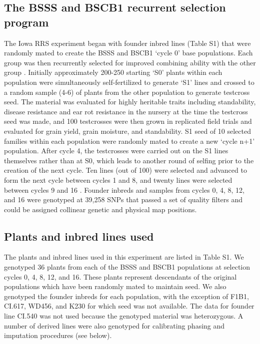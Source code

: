 \documentclass[twocolumn,twoside,letterpaper]{article}
\begin{document}
\subsection*{The BSSS and BSCB1 recurrent selection program}
The Iowa RRS experiment began with founder inbred lines (Table S1) that were randomly mated to create the BSSS and BSCB1 ‘cycle 0’ base populations. 
Each group was then recurrently selected for improved combining ability with the other group \citep{penny1971twenty, keeratinijakal1993responses}. 
Initially approximately 200-250 starting ‘S0’ plants within each population were simultaneously self-fertilized to generate ‘S1’ lines and crossed to a random sample (4-6) of plants from the other population to generate testcross seed. 
The material was evaluated for highly heritable traits including standability, disease resistance and ear rot resistance in the nursery at the time the testcross seed was made, and 100 testcrosses were then grown in replicated field trials and evaluated for grain yield, grain moisture, and standability.  
S1 seed of 10 selected families within each population were randomly mated to create a new ‘cycle n+1’ population. 
After cycle 4, the testcrosses were carried out on the S1 lines themselves rather than at S0, which leads to another round of selfing prior to the creation of the next cycle. Ten lines (out of 100) were selected and advanced to form the next cycle between cycles 1 and 8, and twenty lines were selected between cycles 9 and 16 \citep{keeratinijakal1993responses}. 
Founder inbreds and samples from cycles 0, 4, 8, 12, and 16 were genotyped at 39,258 SNPs that passed a set of quality filters and could be assigned collinear genetic and physical map positions. 

\subsection*{Plants and inbred lines used}
The plants and inbred lines used in this experiment are listed in Table S1. 
We genotyped 36 plants from each of the BSSS and BSCB1 populations at selection cycles 0, 4, 8, 12, and 16. 
These plants represent descendants of the original populations which have been randomly mated to maintain seed. 
We also genotyped the founder inbreds for each population, with the exception of F1B1, CI.617, WD456, and K230 for which seed was not available. 
The data for founder line CI.540 was not used because the genotyped material was heterozygous. 
A number of derived lines were also genotyped for calibrating phasing and imputation procedures (see below).
\end{document}
